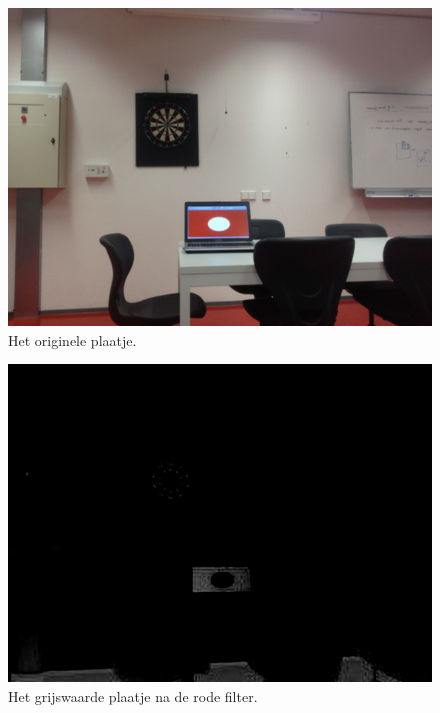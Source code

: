 \begin{figure}[b]
    \begin{center}
        \includegraphics[scale=0.35]{figures/vision/original.png}
    \end{center}
    \caption{Het originele plaatje.}
    \label{fig:org}
\end{figure}

\begin{figure}
    \begin{center}
        \includegraphics[scale=0.35]{figures/vision/filtered.png}
    \end{center}
    \caption{Het grijswaarde plaatje na de rode filter.}
    \label{fig:redFilter}
\end{figure}

